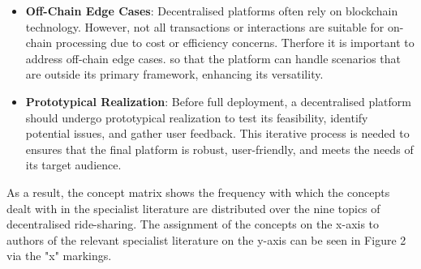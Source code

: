 \begin{itemize}
    \item \textbf{Off-Chain Edge Cases}: Decentralised platforms often rely on blockchain technology. However, not all transactions or interactions are suitable for on-chain processing due to cost or efficiency concerns. Therfore it is important to address off-chain edge cases. so that the platform can handle scenarios that are outside its primary framework, enhancing its versatility.
    
    \item \textbf{Prototypical Realization}: Before full deployment, a decentralised platform should undergo prototypical realization to test its feasibility, identify potential issues, and gather user feedback. This iterative process is needed to ensures that the final platform is robust, user-friendly, and meets the needs of its target audience.
\end{itemize}


As a result, the concept matrix shows the frequency with which the concepts dealt with in the specialist literature are distributed over the nine topics of decentralised ride-sharing. The assignment of the concepts on the x-axis to authors of the relevant specialist literature on the y-axis can be seen in Figure 2 via the "x" markings.



